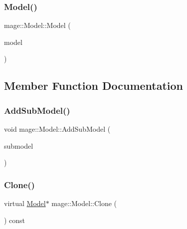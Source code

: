 \subsubsection{\texorpdfstring{Model()}{Model()}\hspace{0.1cm}{\footnotesize\ttfamily [3/3]}}
{\footnotesize\ttfamily mage\+::\+Model\+::\+Model (\begin{DoxyParamCaption}\item[{\hyperlink{classmage_1_1_model}{Model} \&\&}]{model }\end{DoxyParamCaption})\hspace{0.3cm}{\ttfamily [protected]}}



\subsection{Member Function Documentation}
\hypertarget{classmage_1_1_model_abf3f207329b5d4482e515e206e856295}{}\label{classmage_1_1_model_abf3f207329b5d4482e515e206e856295} 
\subsubsection{\texorpdfstring{Add\+Sub\+Model()}{AddSubModel()}}
{\footnotesize\ttfamily void mage\+::\+Model\+::\+Add\+Sub\+Model (\begin{DoxyParamCaption}\item[{\hyperlink{classmage_1_1_sub_model}{Sub\+Model} $\ast$}]{submodel }\end{DoxyParamCaption})}

\hypertarget{classmage_1_1_model_ae5e9bee52da0db8c7a29920c13ed40ea}{}\label{classmage_1_1_model_ae5e9bee52da0db8c7a29920c13ed40ea} 
\subsubsection{\texorpdfstring{Clone()}{Clone()}}
{\footnotesize\ttfamily virtual \hyperlink{classmage_1_1_model}{Model}$\ast$ mage\+::\+Model\+::\+Clone (\begin{DoxyParamCaption}{ }\end{DoxyParamCaption}) const\hspace{0.3cm}{\ttfamily [pure virtual]}}



